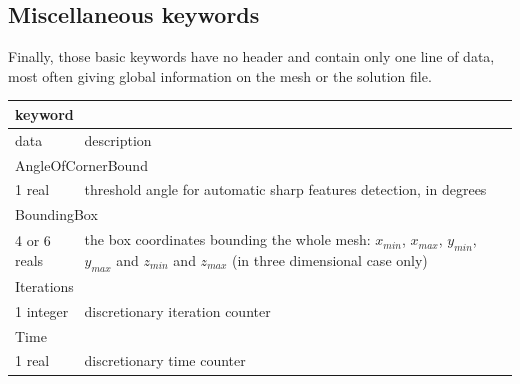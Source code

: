 \documentclass[a4paper,12pt]{article}
\begin{document}
\subsection{Miscellaneous keywords}

Finally, those basic keywords have no header and contain only one line of data, most often giving global information on the mesh or the solution file.

\begin{tabular}{|m{4cm}|m{11cm}|}

\hline
\multicolumn{2}{|l|}{keyword} \\
\hline
data & description \\
\hline\hline

\multicolumn{2}{|l|}{AngleOfCornerBound} \\
\hline
1 real & threshold angle for automatic sharp features detection, in degrees\\
\hline\hline

\multicolumn{2}{|l|}{BoundingBox} \\
\hline
4 or 6 reals & the box coordinates bounding the whole mesh: $x_{min}$, $x_{max}$, $y_{min}$, $y_{max}$ and $z_{min}$ and $z_{max}$ (in three dimensional case only) \\
\hline\hline

\multicolumn{2}{|l|}{Iterations} \\
\hline
1 integer & discretionary iteration counter \\
\hline\hline

\multicolumn{2}{|l|}{Time} \\
\hline
1 real & discretionary time counter \\
\hline

\end{tabular}
\end{document}

